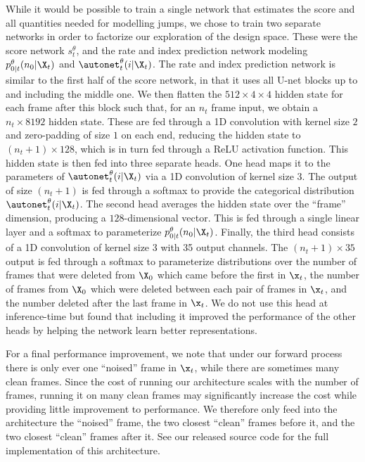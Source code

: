 While it would be possible to train a single network that estimates the score and all quantities needed for modelling jumps, we chose to train two separate networks in order to factorize our exploration of the design space. These were the score network $s_t^\theta$, and the rate and index prediction network modeling $p_{0|t}^\theta(n_0 | \X_t)$ and $\autonet_t^\theta(i | \X_t)$. The rate and index prediction network is similar to the first half of the score network, in that it uses all U-net blocks up to and including the middle one. We then flatten the $512\times4\times4$ hidden state for each frame after this block such that, for an $n_t$ frame input, we obtain a $n_t \times 8192$ hidden state. These are fed through a 1D convolution with kernel size $2$ and zero-padding of size $1$ on each end, reducing the hidden state to $(n_t+1) \times 128$, which is in turn fed through a ReLU activation function. This hidden state is then fed into three separate heads. One head maps it to the parameters of $\autonet_t^\theta(i | \X_t)$ via a 1D convolution of kernel size 3. The output of size $(n_t+1)$ is fed through a softmax to provide the categorical distribution $\autonet_t^\theta(i | \X_t)$. The second head averages the hidden state over the ``frame'' dimension, producing a $128$-dimensional vector. This is fed through a single linear layer and a softmax to parameterize $p_{0|t}^\theta(n_0 | \X_t)$. Finally, the third head consists of a 1D convolution of kernel size 3 with 35 output channels. The $(n_t+1)\times35$ output is fed through a softmax to parameterize distributions over the number of frames that were deleted from $\X_0$ which came before the first in $\x_t$, the number of frames from $\X_0$ which were deleted between each pair of frames in $\x_t$, and the number deleted after the last frame in $\x_t$. We do not use this head at inference-time but found that including it improved the performance of the other heads by helping the network learn better representations. 

For a final performance improvement, we note that under our forward process there is only ever one ``noised'' frame in $\x_t$, while there are sometimes many clean frames. Since the cost of running our architecture scales with the number of frames, running it on many clean frames may significantly increase the cost while providing little improvement to performance. We therefore only feed into the architecture the ``noised'' frame, the two closest ``clean'' frames before it, and the two closest ``clean'' frames after it. See our released source code for the full implementation of this architecture.

